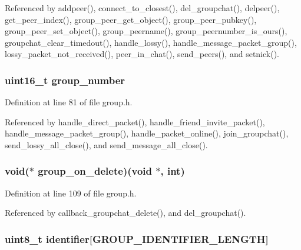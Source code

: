 Referenced by addpeer(), connect\+\_\+to\+\_\+closest(), del\+\_\+groupchat(), delpeer(), get\+\_\+peer\+\_\+index(), group\+\_\+peer\+\_\+get\+\_\+object(), group\+\_\+peer\+\_\+pubkey(), group\+\_\+peer\+\_\+set\+\_\+object(), group\+\_\+peername(), group\+\_\+peernumber\+\_\+is\+\_\+ours(), groupchat\+\_\+clear\+\_\+timedout(), handle\+\_\+lossy(), handle\+\_\+message\+\_\+packet\+\_\+group(), lossy\+\_\+packet\+\_\+not\+\_\+received(), peer\+\_\+in\+\_\+chat(), send\+\_\+peers(), and setnick().

\hypertarget{struct_group__c_a60c6a6ce4c702d61048d0f38f3974ef8}{
\subsubsection[{group\+\_\+number}]{\setlength{\rightskip}{0pt plus 5cm}uint16\+\_\+t group\+\_\+number}}\label{struct_group__c_a60c6a6ce4c702d61048d0f38f3974ef8}


Definition at line 81 of file group.\+h.



Referenced by handle\+\_\+direct\+\_\+packet(), handle\+\_\+friend\+\_\+invite\+\_\+packet(), handle\+\_\+message\+\_\+packet\+\_\+group(), handle\+\_\+packet\+\_\+online(), join\+\_\+groupchat(), send\+\_\+lossy\+\_\+all\+\_\+close(), and send\+\_\+message\+\_\+all\+\_\+close().

\hypertarget{struct_group__c_a43df326d671eb30dd294d5d71d3cd09c}{
\subsubsection[{group\+\_\+on\+\_\+delete}]{\setlength{\rightskip}{0pt plus 5cm}void($\ast$ group\+\_\+on\+\_\+delete)(void $\ast$, int)}}\label{struct_group__c_a43df326d671eb30dd294d5d71d3cd09c}


Definition at line 109 of file group.\+h.



Referenced by callback\+\_\+groupchat\+\_\+delete(), and del\+\_\+groupchat().

\hypertarget{struct_group__c_a590984b7f44686ea4892ffa2651b0cda}{
\subsubsection[{identifier}]{\setlength{\rightskip}{0pt plus 5cm}uint8\+\_\+t identifier\mbox{[}{\bf G\+R\+O\+U\+P\+\_\+\+I\+D\+E\+N\+T\+I\+F\+I\+E\+R\+\_\+\+L\+E\+N\+G\+T\+H}\mbox{]}}}\label{struct_group__c_a590984b7f44686ea4892ffa2651b0cda}


